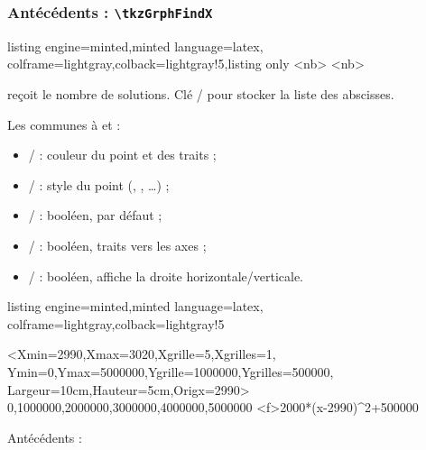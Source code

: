 \documentclass[11pt,a4paper]{ltxdoc}
\begin{document}
\subsubsection{Antécédents : \texttt{\textbackslash tkzGrphFindX}}

\begin{tcblisting}{listing engine=minted,minted language=latex,
  colframe=lightgray,colback=lightgray!5,listing only}
<nb>
<nb>
\end{tcblisting}

 reçoit le nombre de solutions. Clé / pour stocker la liste des abscisses.

\smallskip

Les \MontreCode{[clés]} communes à  et  :

\begin{itemize}
	\item {} /  : couleur du point et des traits ;
	\item {} /  : style du point (, , \ldots) ;
	\item {} /  : booléen,  par défaut ;
	\item {} /  : booléen, traits vers les axes ;
	\item {} /  : booléen, affiche la droite horizontale/verticale.
\end{itemize}

\begin{tcblisting}{listing engine=minted,minted language=latex,
  colframe=lightgray,colback=lightgray!5}
\begin{tkzGrph}%
    <Xmin=2990,Xmax=3020,Xgrille=5,Xgrilles=1,
    Ymin=0,Ymax=5000000,Ygrille=1000000,Ygrilles=500000,
    Largeur=10cm,Hauteur=5cm,Origx=2990>
    {0,1000000,2000000,3000000,4000000,5000000}
  \tkzGrphDefineCurve[trace,name=cf,color=red]<f>{2000*(x-2990)^2+500000}
\end{tkzGrph}

Antécédents : \ANTS
\end{tcblisting}
\end{document}
